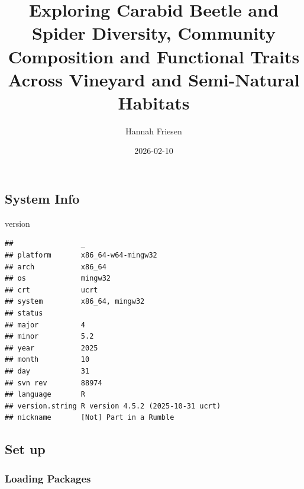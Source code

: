 \documentclass[
]{article}
\title{Exploring Carabid Beetle and Spider Diversity, Community
Composition and Functional Traits Across Vineyard and Semi-Natural
Habitats}
\author{Hannah Friesen}
\date{2026-02-10}
\newenvironment{Shaded}{\begin{snugshade}}{\end{snugshade}}
\newcommand{\NormalTok}[1]{#1}
\begin{document}
\maketitle

{
\setcounter{tocdepth}{4}
\tableofcontents
}
\subsection{System Info}\label{system-info}

\begin{Shaded}
\begin{Highlighting}[]
\NormalTok{version}
\end{Highlighting}
\end{Shaded}

\begin{verbatim}
##                _                                
## platform       x86_64-w64-mingw32               
## arch           x86_64                           
## os             mingw32                          
## crt            ucrt                             
## system         x86_64, mingw32                  
## status                                          
## major          4                                
## minor          5.2                              
## year           2025                             
## month          10                               
## day            31                               
## svn rev        88974                            
## language       R                                
## version.string R version 4.5.2 (2025-10-31 ucrt)
## nickname       [Not] Part in a Rumble
\end{verbatim}

\subsection{Set up}\label{set-up}

\subsubsection{Loading Packages}\label{loading-packages}
\end{document}
